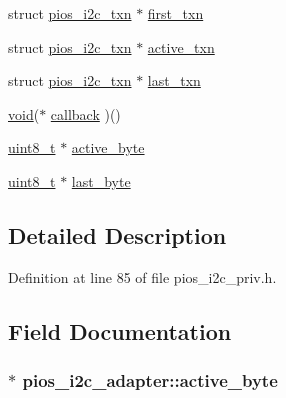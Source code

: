 \begin{DoxyCompactItemize}
\item 
struct \hyperlink{structpios__i2c__txn}{pios\-\_\-i2c\-\_\-txn} $\ast$ \hyperlink{structpios__i2c__adapter_ad98b03cc641fe33909c19a8e96cb64d5}{first\-\_\-txn}
\item 
struct \hyperlink{structpios__i2c__txn}{pios\-\_\-i2c\-\_\-txn} $\ast$ \hyperlink{structpios__i2c__adapter_a9f7ec0aa23437d00ceade3b67625eec6}{active\-\_\-txn}
\item 
struct \hyperlink{structpios__i2c__txn}{pios\-\_\-i2c\-\_\-txn} $\ast$ \hyperlink{structpios__i2c__adapter_af283735c4934e46748f2461bf338811e}{last\-\_\-txn}
\item 
\hyperlink{group___n_a_m_e_ga18028b8badbf1ea7e704ccac3c488e82}{void}($\ast$ \hyperlink{structpios__i2c__adapter_abe4e844b2ffcd0984dc55c8985bd0401}{callback} )()
\item 
\hyperlink{stdint_8h_aba7bc1797add20fe3efdf37ced1182c5}{uint8\-\_\-t} $\ast$ \hyperlink{structpios__i2c__adapter_a841cb6403bc7fc1cde74b36755789d03}{active\-\_\-byte}
\item 
\hyperlink{stdint_8h_aba7bc1797add20fe3efdf37ced1182c5}{uint8\-\_\-t} $\ast$ \hyperlink{structpios__i2c__adapter_a09797c133013f2126da829410d1df0c0}{last\-\_\-byte}
\end{DoxyCompactItemize}


\subsection{Detailed Description}


Definition at line 85 of file pios\-\_\-i2c\-\_\-priv.\-h.



\subsection{Field Documentation}
\hypertarget{structpios__i2c__adapter_a841cb6403bc7fc1cde74b36755789d03}{
\subsubsection[{active\-\_\-byte}]{$\ast$ pios\-\_\-i2c\-\_\-adapter\-::active\-\_\-byte}}\label{structpios__i2c__adapter_a841cb6403bc7fc1cde74b36755789d03}


